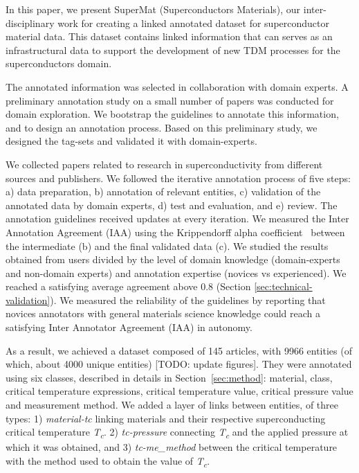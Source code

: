\documentclass[fleqn,10pt]{wlscirep}
\begin{document}
In this paper, we present SuperMat (Superconductors Materials), our inter-disciplinary work for creating a linked annotated dataset for superconductor material data. This dataset contains linked information that can serves as an infrastructural data to support the development of new TDM processes for the superconductors domain. 

The annotated information was selected in collaboration with domain experts. 
A preliminary annotation study on a small number of papers was conducted for domain exploration. We bootstrap the guidelines to annotate this information, and to design an annotation process.
Based on this preliminary study, we designed the tag-sets and validated it with domain-experts. 

We collected papers related to research in superconductivity from different sources and publishers.  
We followed the iterative annotation process of five steps: a) data preparation, b) annotation of relevant entities, c) validation of the annotated data by domain experts, d) test and evaluation, and e) review. The annotation guidelines received updates at every iteration. 
We measured the Inter Annotation Agreement (IAA) using the Krippendorff alpha coefficient~\cite{Krippendorff2004ReliabilityIC} between the intermediate (b) and the final validated data (c). We studied the results obtained from users divided by the level of domain knowledge (domain-experts and non-domain experts) and annotation expertise (novices vs experienced). 
We reached a satisfying average agreement above 0.8 (Section \ref{sec:technical-validation}). 
We measured the reliability  of the guidelines by reporting that novices annotators with general materials science knowledge could reach a satisfying Inter Annotator Agreement (IAA) in autonomy.

As a result, we achieved a dataset composed of 145 articles, with 9966 entities (of which, about 4000 unique entities) [TODO: update figures]. They were annotated using six classes, described in details in Section~\ref{sec:method}: material, class, critical temperature expressions, critical temperature value, critical pressure value and measurement method.
We added a layer of links between entities, of three types: 1) \textit{material-tc} linking materials and their respective superconducting critical temperature \textit{T\textsubscript{c}}. 
2) \textit{tc-pressure} connecting \textit{T\textsubscript{c}} and the applied pressure at which it was obtained, and 3) \textit{tc-me\_method} between the critical temperature with the method used to obtain the value of \textit{T\textsubscript{c}}. 
\end{document}
